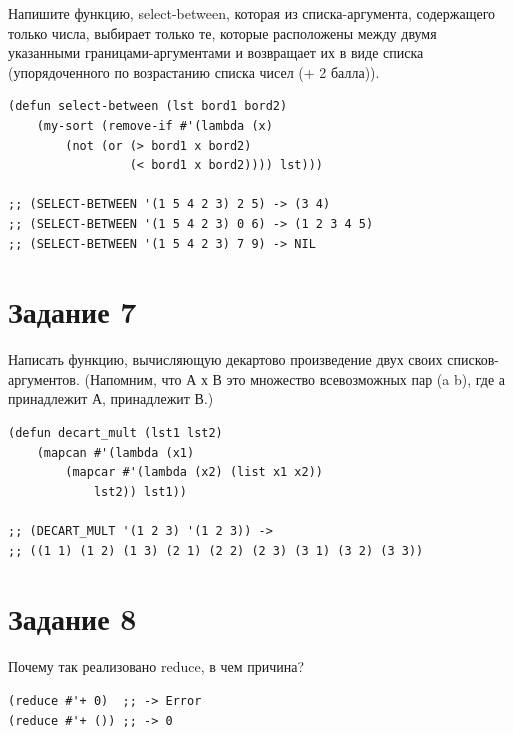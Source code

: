 \documentclass[a4paper,14pt, unknownkeysallowed]{extreport}
\begin{document}
Напишите функцию, select-between, которая из списка-аргумента, содержащего только числа, выбирает только те, которые расположены между двумя указанными границами-аргументами и возвращает их в виде списка (упорядоченного по возрастанию списка чисел (+ 2 балла)).

\begin{center}
\captionsetup{justification=raggedright,singlelinecheck=off}
\begin{lstlisting}[label=lst:parallel_processing,caption=Решение задания 6]
(defun select-between (lst bord1 bord2)
    (my-sort (remove-if #'(lambda (x) 
        (not (or (> bord1 x bord2)
                 (< bord1 x bord2)))) lst)))

;; (SELECT-BETWEEN '(1 5 4 2 3) 2 5) -> (3 4)
;; (SELECT-BETWEEN '(1 5 4 2 3) 0 6) -> (1 2 3 4 5)
;; (SELECT-BETWEEN '(1 5 4 2 3) 7 9) -> NIL
\end{lstlisting}
\end{center}

\section{Задание 7}

Написать функцию, вычисляющую декартово произведение двух своих списков-аргументов. (Напомним, что А х В это множество всевозможных пар (a b), где а принадлежит А, принадлежит В.)

\begin{center}
\captionsetup{justification=raggedright,singlelinecheck=off}
\begin{lstlisting}[label=lst:parallel_processing,caption=Решение задания 7]
(defun decart_mult (lst1 lst2)
    (mapcan #'(lambda (x1) 
        (mapcar #'(lambda (x2) (list x1 x2)) 
            lst2)) lst1))

;; (DECART_MULT '(1 2 3) '(1 2 3)) ->
;; ((1 1) (1 2) (1 3) (2 1) (2 2) (2 3) (3 1) (3 2) (3 3))
\end{lstlisting}
\end{center}

\clearpage

\section{Задание 8}

Почему так реализовано reduce, в чем причина? 

\begin{center}
\captionsetup{justification=raggedright,singlelinecheck=off}
\begin{lstlisting}[label=lst:parallel_processing,caption=Решение задания 8]
(reduce #'+ 0)  ;; -> Error
(reduce #'+ ()) ;; -> 0
\end{lstlisting}
\end{center}
\end{document}
